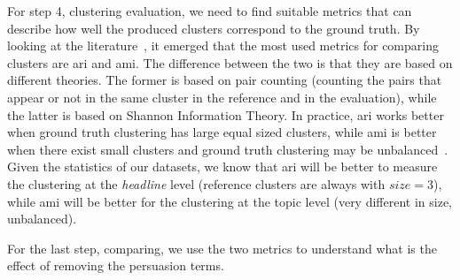
For step 4, clustering evaluation, we need to find suitable metrics that can describe how well the produced clusters correspond to the ground truth.
By looking at the literature~\citep{romano2016adjusting,warrens2022understanding}, it emerged that the most used metrics for comparing clusters are \acrfull{ari} and \acrfull{ami}.
The difference between the two is that they are based on different theories. The former is based on pair counting (counting the pairs that appear or not in the same cluster in the reference and in the evaluation), while the latter is based on Shannon Information Theory. In practice, \acrshort{ari} works better when ground truth clustering has large equal sized clusters, while \acrshort{ami} is better when there exist small clusters and ground truth clustering may be unbalanced~\cite{warrens2022understanding}.
Given the statistics of our datasets, we know that \acrshort{ari} will be better to measure the clustering at the \emph{headline} level (reference clusters are always with $size=3$), while \acrshort{ami} will be better for the clustering at the topic level (very different in size, unbalanced).






For the last step, comparing, we use the two metrics to understand what is the effect of removing the persuasion terms.


